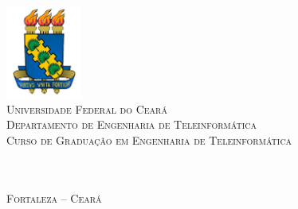 \thispagestyle{empty}%

\begin{center}
    \includegraphics[width=2.5cm,bb=0 0 382 465]{figs/ufc.jpg} \\%
    \textsc{
    Universidade Federal do Cear\'{a} \\%
    Departamento de Engenharia de Teleinform\'{a}tica \\%
    Curso de Gradua\c{c}\~{a}o em Engenharia de Teleinform\'{a}tica\\
    }
    \vspace{2.5 cm}%
    {       \textbf{\autor}
    }\\%

    \null\vfill%
    \vspace{.2cm}%
    {\Large         \textbf{\titulo}\\}


    \null\vfill%
    \vspace{1 cm}%
    {\normalsize    \textsc{Fortaleza -- Cear\'{a} \\%
                            \monthname~\the\year }}
\end{center}
